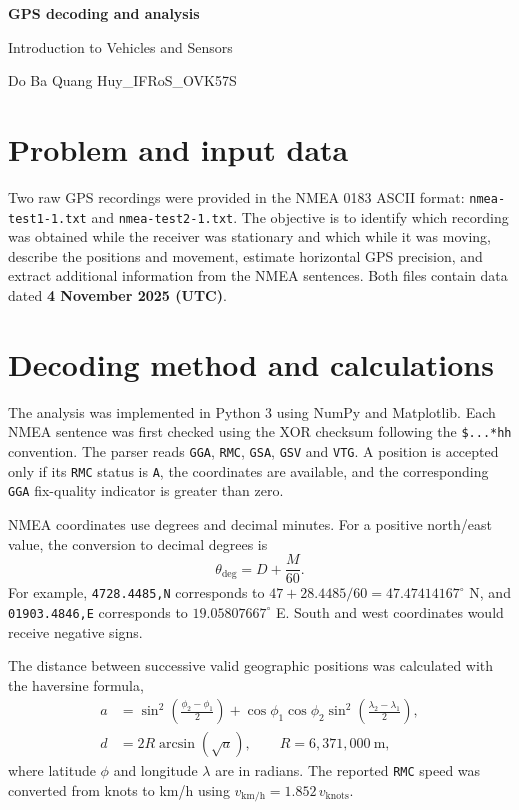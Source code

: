 \documentclass[11pt,a4paper]{article}
\newcommand{\sourcename}[1]{\texttt{#1}}
\begin{document}
\begin{center}
  {\LARGE\bfseries GPS decoding and analysis\par}
  \vspace{4pt}
  {\normalsize Introduction to Vehicles and Sensors\par}
  \vspace{3pt}
  {\normalsize Do Ba Quang Huy\_IFRoS\_OVK57S\par}
\end{center}
\vspace{5pt}

\section{Problem and input data}

Two raw GPS recordings were provided in the NMEA 0183 ASCII format:
\sourcename{nmea-test1-1.txt} and \sourcename{nmea-test2-1.txt}. The objective is to identify which recording was obtained while the receiver was stationary and which while it was moving, describe the positions and movement, estimate horizontal GPS precision, and extract additional information from the NMEA sentences. Both files contain data dated \textbf{4 November 2025 (UTC)}.

\section{Decoding method and calculations}

The analysis was implemented in Python 3 using NumPy and Matplotlib. Each NMEA sentence was first checked using the XOR checksum following the \texttt{\$...*hh} convention. The parser reads \texttt{GGA}, \texttt{RMC}, \texttt{GSA}, \texttt{GSV} and \texttt{VTG}. A position is accepted only if its \texttt{RMC} status is \texttt{A}, the coordinates are available, and the corresponding \texttt{GGA} fix-quality indicator is greater than zero.

NMEA coordinates use degrees and decimal minutes. For a positive north/east value, the conversion to decimal degrees is
\begin{equation}
  \theta_{\mathrm{deg}}=D+\frac{M}{60}.
\end{equation}
For example, \texttt{4728.4485,N} corresponds to $47+28.4485/60=47.47414167^{\circ}$ N, and \texttt{01903.4846,E} corresponds to $19.05807667^{\circ}$ E. South and west coordinates would receive negative signs.

The distance between successive valid geographic positions was calculated with the haversine formula,
\begin{align}
 a &= \sin^2\!\left(\frac{\phi_2-\phi_1}{2}\right)
 + \cos\phi_1\cos\phi_2\sin^2\!\left(\frac{\lambda_2-\lambda_1}{2}\right), \\
 d &= 2R\arcsin(\sqrt{a}), \qquad R=6{,}371{,}000\ \mathrm{m},
\end{align}
where latitude $\phi$ and longitude $\lambda$ are in radians. The reported \texttt{RMC} speed was converted from knots to km/h using $v_{\mathrm{km/h}}=1.852\,v_{\mathrm{knots}}$.
\end{document}
